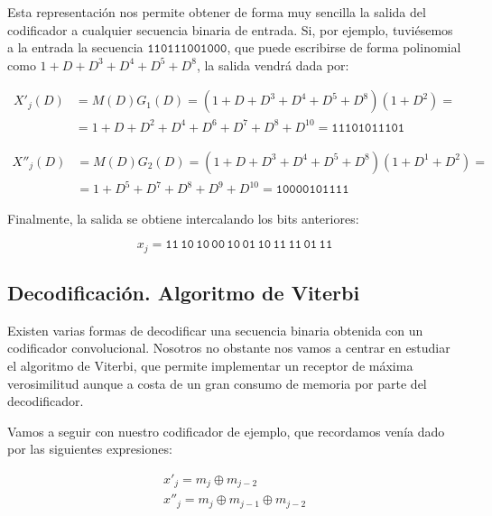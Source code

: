 \documentclass[es,apuntes]{uah}
\begin{document}
{Esta representación nos permite obtener de forma muy sencilla la salida del codificador a cualquier secuencia binaria de entrada. Si, por ejemplo, tuviésemos a la entrada la secuencia $\mathtt{110111001000}$, que puede escribirse de forma polinomial como $1 + D + D^3 + D^4 + D^5 + D^8$, la salida vendrá dada por:

\begin{displaymath}
	\begin{array}{ll}
	X'_j(D) & = M(D) G_1(D) = (1 + D + D^3 + D^4 + D^5 + D^8) (1 + D^2) = \\
			& = 1 + D + D^2 + D^4 + D^6 + D^7 + D^8 + D^{10} = \mathtt{11101011101}
	\end{array}
\end{displaymath}

\begin{displaymath}
	\begin{array}{ll}
	X''_j(D) & = M(D) G_2(D) = (1 + D + D^3 + D^4 + D^5 + D^8) (1 + D^1 + D^2) = \\
			& = 1 + D^5 + D^7 + D^8 + D^9 + D^{10} = \mathtt{10000101111}
	\end{array}
\end{displaymath}

Finalmente, la salida se obtiene intercalando los bits anteriores:

\begin{displaymath}
	x_j = \mathtt{11\, 10\, 10\, 00\, 10\, 01\, 10\, 11\, 11\, 01\, 11}
\end{displaymath}


\subsection{Decodificación. Algoritmo de Viterbi}

Existen varias formas de decodificar una secuencia binaria obtenida con un codificador convolucional. Nosotros no obstante nos vamos a centrar en estudiar el algoritmo de Viterbi, que permite implementar un receptor de máxima verosimilitud aunque a costa de un gran consumo de memoria por parte del decodificador. 

Vamos a seguir con nuestro codificador de ejemplo, que recordamos venía dado por las siguientes expresiones:

\begin{displaymath}
	\begin{array}{l}
		x'_j = m_j \oplus m_{j-2} \\
		x''_j = m_j \oplus m_{j-1} \oplus m_{j-2} \\
	\end{array}
\end{displaymath}

}
\end{document}
